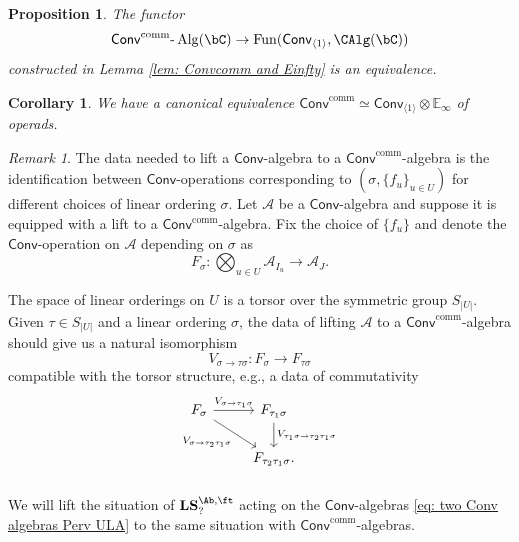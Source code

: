 \documentclass[10pt]{amsart}
\newcommand{\sssec}{\subsubsection}
\newtheorem{prop}[subsubsection]{Proposition}
\newtheorem{cor}[subsubsection]{Corollary}
\theoremstyle{remark}
\newtheorem{rmk}[subsubsection]{Remark}
\newcommand{\E}{\mathbb{E}}
\newcommand{\on}{\operatorname}
\newcommand{\cA}{\mathcal{A}}
\newcommand{\lAlg}{\text{-}\on{Alg}}
\newcommand{\Fun}{\on{Fun}}
\newcommand{\Conv}{\mathsf{Conv}}
\newcommand{\Convcomm}{\mathsf{Conv}^{\on{comm}}}
\begin{document}
\begin{prop}
    The functor
    \begin{equation}\label{eq: Convcomm and Einfty}
        \Convcomm\lAlg(\bC)\rightarrow \Fun(\Conv_{\langle 1\rangle},\CAlg(\bC))
    \end{equation}
    constructed in Lemma \ref{lem: Convcomm and Einfty} is an equivalence.
\end{prop}

\begin{cor}
    We have a canonical equivalence $\Convcomm\simeq \Conv_{\langle 1\rangle}\otimes\E_{\infty}$ of operads.
\end{cor}

\begin{rmk}\label{rmk: lifting Conv to Convcomm}
    The data needed to lift a $\Conv$-algebra to a $\Convcomm$-algebra is the identification between $\Conv$-operations corresponding to $(\sigma, \{f_u\}_{u\in U})$ for different choices of linear ordering $\sigma$. Let $\cA$ be a $\Conv$-algebra and suppose it is equipped with a lift to a $\Convcomm$-algebra. Fix the choice of $\{f_u\}$ and denote the $\Conv$-operation on $\cA$ depending on $\sigma$ as
    \[F_{\sigma}: \bigotimes_{u\in U} \cA_{I_u}\rightarrow \cA_J.\]
    
    The space of linear orderings on $U$ is a torsor over the symmetric group $S_{|U|}$. Given $\tau\in S_{|U|}$ and a linear ordering $\sigma$, the data of lifting $\cA$ to a $\Convcomm$-algebra should give us a natural isomorphism 
    \begin{equation}\label{eq: symmetric group repn}
        V_{\sigma\rightarrow\tau\sigma}: F_{\sigma}\rightarrow F_{\tau\sigma}
    \end{equation}
    compatible with the torsor structure, e.g., a data of commutativity
    \[\begin{tikzcd}
	{F_{\sigma}} & {F_{\tau_1\sigma}} \\
	& {F_{\tau_2\tau_1\sigma}.}
	\arrow["{V_{\sigma\rightarrow\tau_1\sigma}}", from=1-1, to=1-2]
	\arrow["{V_{\sigma\rightarrow \tau_2\tau_1\sigma}}"', from=1-1, to=2-2]
	\arrow["{V_{\tau_1\sigma\rightarrow \tau_2\tau_1\sigma}}", from=1-2, to=2-2]
\end{tikzcd}\]
\end{rmk}


    \sssec{}
    We will lift the situation of $\textbf{LS}^{\Ab,\ft}_{?}$ acting on the $\Conv$-algebras \eqref{eq: two Conv algebras Perv ULA} to the same situation with $\Convcomm$-algebras.
    \medskip
    
\end{document}

